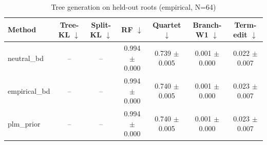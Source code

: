 \begin{table}[t]\centering
\caption{Tree generation on held-out roots (empirical, N=64)}
\begin{tabular}{lcccccc}
\toprule
Method & Tree-KL $\downarrow$ & Split-KL $\downarrow$ & RF $\downarrow$ & Quartet $\downarrow$ & Branch-W1 $\downarrow$ & Term-edit $\downarrow$ \\
\midrule
neutral\_bd & -- & -- & 0.994 $\pm$ 0.000 & 0.739 $\pm$ 0.005 & 0.001 $\pm$ 0.000 & 0.022 $\pm$ 0.007 \\
empirical\_bd & -- & -- & 0.994 $\pm$ 0.000 & 0.740 $\pm$ 0.005 & 0.001 $\pm$ 0.000 & 0.023 $\pm$ 0.007 \\
plm\_prior & -- & -- & 0.994 $\pm$ 0.000 & 0.740 $\pm$ 0.005 & 0.001 $\pm$ 0.000 & 0.023 $\pm$ 0.007 \\
\bottomrule
\end{tabular}
\end{table}